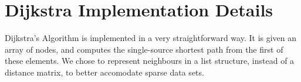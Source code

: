 \section{Dijkstra Implementation Details}

Dijkstra's Algorithm is implemented in a very straightforward way. It is given an array of nodes, and computes the single-source shortest path from the first of these elements.
We chose to represent neighbours in a list structure, instead of a distance matrix, to better accomodate sparse data sets.